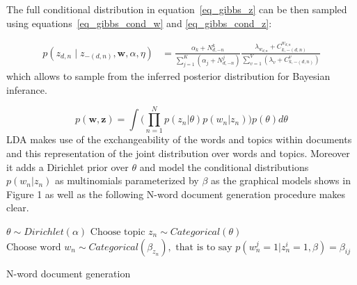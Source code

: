 \documentclass[12pt,a4paper,onecolumn]{article}
\begin{document}
The full conditional distribution in equation~\eqref{eq_gibbs_z} can be then sampled using equations~\eqref{eq_gibbs_cond_w} and \eqref{eq_gibbs_cond_z}:

\begin{align}
	p(z_{d,n} \mid z_{-(d,n)}, \bm{w}, \alpha, \eta) &= \frac{\alpha_k + N_{d,-n}^k}{\sum_{j=1}^K \left(\alpha_j + N_{d,-n}^j\right)}\frac{\lambda_{w_{d,n}} + C_{k,-(d,n)}^{w_{d,n}}}{\sum_{v=1}^V\left(\lambda_v + C_{k,-(d,n)}^{v}\right)}
\end{align}
which allows to sample from the inferred posterior distribution for Bayesian inferance.



\newpage
%

$$p(\mathbf{w}, \mathbf{z})=\int \Big(\prod_{n=1}^N p(z_n|\theta)p(w_n|z_n)\Big)p(\theta)d\theta$$
LDA makes use of the exchangeability of the words and topics within documents and this representation of the joint distribution over words and topics. Moreover it adds a Dirichlet prior over $\theta$ and model the conditional distributions $p(w_n|z_n)$ as multinomials parameterized by $\beta$ as the graphical models shows in Figure 1 as well as the following N-word document generation procedure makes clear.

\begin{algorithm}
	\begin{algorithmic}
		\State $\theta \sim Dirichlet(\alpha)$
		\State $\text{Choose topic } z_n \sim Categorical(\theta)$
		\State $\text{Choose word }w_n \sim Categorical(\beta_{z_n}), \text{ that is to say }p(w_n^j=1|z_n^i=1,\beta)=\beta_{ij}$
		\EndFor
	\end{algorithmic}
	\caption{N-word document generation}
	\label{alg:doc}
\end{algorithm}
\end{document}
